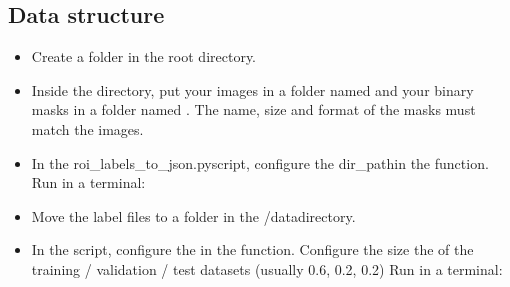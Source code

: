 \documentclass[letterpaper,10pt,english]{sphinxmanual}
\begin{document}
\subsection{Data structure}
\label{\detokenize{index:data-structure}}\begin{itemize}
\item {} 
\sphinxAtStartPar
Create a  folder in the root directory.

\item {} 
\sphinxAtStartPar
Inside the  directory, put your images in a folder named  and your binary masks in a folder named . The name, size and format of the masks must match the images.

\item {} 
\sphinxAtStartPar
In the {\color{red}\bfseries{}\textasciigrave{}\textasciigrave{}}roi\_labels\_to\_json.py\textasciigrave{}\textasciigrave{}script, configure the {\color{red}\bfseries{}\textasciigrave{}\textasciigrave{}}dir\_path\textasciigrave{}\textasciigrave{}in the  function. Run in a terminal:

\end{itemize}

\begin{sphinxVerbatim}[commandchars=\\\{\}]
 
\end{sphinxVerbatim}
\begin{itemize}
\item {} 
\sphinxAtStartPar
Move the label files to a  folder in the {\color{red}\bfseries{}\textasciigrave{}\textasciigrave{}}/data\textasciigrave{}\textasciigrave{}directory.

\item {} 
\sphinxAtStartPar
In the  script, configure the  in the  function. Configure the size the of the training / validation / test datasets (usually 0.6, 0.2, 0.2) Run in a terminal:

\end{itemize}

\begin{sphinxVerbatim}[commandchars=\\\{\}]
 
\end{sphinxVerbatim}
\end{document}
